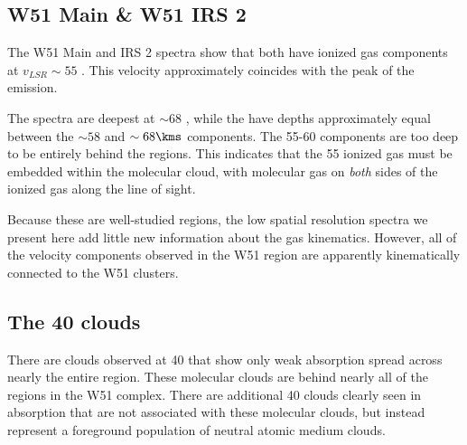 \subsection{W51 Main \& W51 IRS 2}
The W51 Main and IRS 2 spectra show that both have ionized gas components at
$v_{LSR}\sim 55$ \kms.  This velocity approximately coincides with the peak of
the \thirteenco emission.

The \formaldehyde \oneone spectra are deepest at $\sim68$ \kms, while the
\twotwo have depths approximately equal between the $\sim58$ \kms and $\sim 68
\kms$ components.  The 55-60 \kms components are too deep to be entirely behind
the \hii regions.  This indicates that the 55 \kms ionized gas must be embedded
within the molecular cloud, with molecular gas on \emph{both} sides of the
ionized gas along the line of sight.

Because these are well-studied regions, the low spatial resolution
\formaldehyde spectra we present here add little new information about the gas
kinematics.  However, all of the velocity components observed in the W51 region
are apparently kinematically connected to the W51 clusters.

\subsection{The 40 \kms clouds}
There are clouds observed at 40 \kms that show only weak \formaldehyde
absorption spread across nearly the entire region.  These molecular clouds are
behind nearly all of the \hii regions in the W51 complex.  There are additional
40 \kms clouds clearly seen in \hi absorption \citep{Stil2006a} that are not
associated with these molecular clouds, but instead represent a foreground
population of neutral atomic medium clouds.




